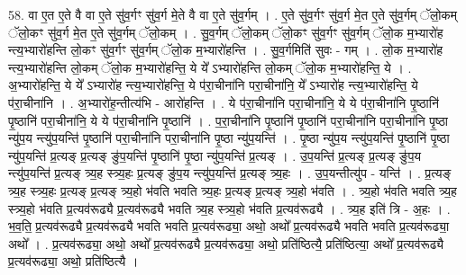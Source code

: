\documentclass[17pt]{extarticle}
\begin{document}
58. वा ए॒त ए॒ते वै वा ए॒ते सु॑व॒र्गꣳ सु॑व॒र्ग मे॒ते वै वा ए॒ते सु॑व॒र्गम् । . ए॒ते सु॑व॒र्गꣳ सु॑व॒र्ग मे॒त ए॒ते सु॑व॒र्गम् ॅलो॒कम् ॅलो॒कꣳ सु॑व॒र्ग मे॒त ए॒ते सु॑व॒र्गम् ॅलो॒कम् । . सु॒व॒र्गम् ॅलो॒कम् ॅलो॒कꣳ सु॑व॒र्गꣳ सु॑व॒र्गम् ॅलो॒क म॒भ्यारो॑ह न्त्य॒भ्यारो॑हन्ति लो॒कꣳ सु॑व॒र्गꣳ सु॑व॒र्गम् ॅलो॒क म॒भ्यारो॑हन्ति । . सु॒व॒र्गमिति॑ सुवः - गम् । . लो॒क म॒भ्यारो॑ह न्त्य॒भ्यारो॑हन्ति लो॒कम् ॅलो॒क म॒भ्यारो॑हन्ति॒ ये ये᳚ ऽभ्यारो॑हन्ति लो॒कम् ॅलो॒क म॒भ्यारो॑हन्ति॒ ये । . अ॒भ्यारो॑हन्ति॒ ये ये᳚ ऽभ्यारो॑ह न्त्य॒भ्यारो॑हन्ति॒ ये प॑रा॒चीना॑नि परा॒चीना॑नि॒ ये᳚ ऽभ्यारो॑ह न्त्य॒भ्यारो॑हन्ति॒ ये प॑रा॒चीना॑नि । . अ॒भ्यारो॑ह॒न्तीत्य॑भि - आरो॑हन्ति । . ये प॑रा॒चीना॑नि परा॒चीना॑नि॒ ये ये प॑रा॒चीना॑नि पृ॒ष्ठानि॑ पृ॒ष्ठानि॑ परा॒चीना॑नि॒ ये ये प॑रा॒चीना॑नि पृ॒ष्ठानि॑ । . प॒रा॒चीना॑नि पृ॒ष्ठानि॑ पृ॒ष्ठानि॑ परा॒चीना॑नि परा॒चीना॑नि पृ॒ष्ठा न्यु॑प॒य न्त्यु॑प॒यन्ति॑ पृ॒ष्ठानि॑ परा॒चीना॑नि परा॒चीना॑नि पृ॒ष्ठा न्यु॑प॒यन्ति॑ । . पृ॒ष्ठा न्यु॑प॒य न्त्यु॑प॒यन्ति॑ पृ॒ष्ठानि॑ पृ॒ष्ठा न्यु॑प॒यन्ति॑ प्र॒त्यङ् प्र॒त्यङ् ङु॑प॒यन्ति॑ पृ॒ष्ठानि॑ पृ॒ष्ठा न्यु॑प॒यन्ति॑ प्र॒त्यङ् । . उ॒प॒यन्ति॑ प्र॒त्यङ् प्र॒त्यङ् ङु॑प॒य न्त्यु॑प॒यन्ति॑ प्र॒त्यङ् त्र्य॒ह स्त्र्य॒हः प्र॒त्यङ् 
ङु॑प॒य न्त्यु॑प॒यन्ति॑ प्र॒त्यङ् त्र्य॒हः । . उ॒प॒यन्तीत्यु॑प - यन्ति॑ । . प्र॒त्यङ् त्र्य॒ह स्त्र्य॒हः प्र॒त्यङ् प्र॒त्यङ् त्र्य॒हो भ॑वति भवति त्र्य॒हः प्र॒त्यङ् प्र॒त्यङ् त्र्य॒हो भ॑वति । . त्र्य॒हो भ॑वति भवति त्र्य॒ह स्त्र्य॒हो भ॑वति प्र॒त्यव॑रूढ्यै प्र॒त्यव॑रूढ्यै भवति त्र्य॒ह स्त्र्य॒हो भ॑वति प्र॒त्यव॑रूढ्यै । . त्र्य॒ह इति॑ त्रि - अ॒हः । . भ॒व॒ति॒ प्र॒त्यव॑रूढ्यै प्र॒त्यव॑रूढ्यै भवति भवति प्र॒त्यव॑रूढ्या॒ अथो॒ अथो᳚ प्र॒त्यव॑रूढ्यै भवति भवति प्र॒त्यव॑रूढ्या॒ अथो᳚ । . प्र॒त्यव॑रूढ्या॒ अथो॒ अथो᳚ प्र॒त्यव॑रूढ्यै प्र॒त्यव॑रूढ्या॒ अथो॒ प्रति॑ष्ठित्यै॒ प्रति॑ष्ठित्या॒ अथो᳚ प्र॒त्यव॑रूढ्यै प्र॒त्यव॑रूढ्या॒ अथो॒ प्रति॑ष्ठित्यै । \newline
\end{document}
